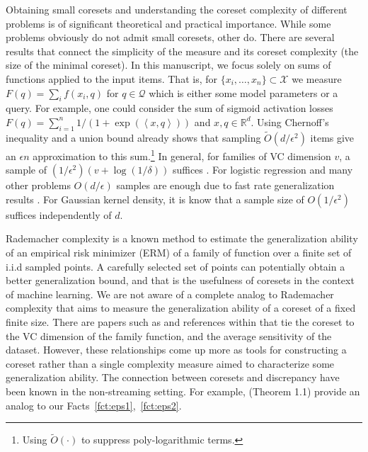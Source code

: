 \documentclass[anon,12pt]{colt2019} %
\newcommand{\ip}[1]{\left \langle #1 \right \rangle}
\newcommand{\R}{\mathbb{R}}
\newcommand{\eps}{\epsilon}
\newcommand{\X}{\mathcal{X}}
\newcommand{\Q}{\mathcal{Q}}
\begin{document}
Obtaining small coresets and understanding the coreset complexity of different problems is of significant theoretical and practical importance.
While some problems obviously do not admit small coresets, other do. 
There are several results that connect the simplicity of the measure and its coreset complexity (the size of the minimal coreset).
In this manuscript, we focus solely on sums of functions applied to the input items.
That is, for $\{x_i,\ldots,x_n\} \subset \X$ we measure $F(q) = \sum_i f(x_i,q)$ for $q \in \Q$ which is either some model parameters or a query.
For example, one could consider the sum of sigmoid activation losses $F(q) = \sum_{i=1}^{n} 1/(1+ \exp(\ip{x,q}))$ and $x,q\in \R^d$.
Using Chernoff's inequality and a union bound already shows that sampling $\tilde O(d/\eps^2)$ items give an $\eps n$ approximation to this sum.\footnote{Using $\tilde O(\cdot)$ to suppress poly-logarithmic terms.} 
In general, for families of VC dimension $v$, a sample of $(1/\eps^2)(v+\log(1/\delta))$ suffices \cite{talagrand1994sharper}.
For logistic regression and many other problems $O(d/\eps)$ samples are enough due to fast rate generalization results \cite{van2015fast}.
For Gaussian kernel density, it is know that a sample size of $O(1/\eps^2)$ suffices independently of $d$.

Rademacher complexity \cite{Bartlett:2003:RGC:944919.944944} is a known method to estimate the generalization ability of an empirical risk minimizer (ERM) of a family of function over a finite set of i.i.d sampled points. A carefully selected set of points can potentially obtain a better generalization bound, and that is the usefulness of coresets in the context of machine learning. We are not aware of a complete analog to Rademacher complexity that aims to measure the generalization ability of a coreset of a fixed finite size. There are papers such as \cite{langberg2010universal, tolochinsky2018coresets} and references within that tie the coreset to the VC dimension of the family function, and the average sensitivity of the dataset. However, these relationships come up more as tools for constructing a coreset rather than a single complexity measure aimed to characterize some generalization ability. The connection between coresets and discrepancy have been known in the non-streaming setting. For example, \cite{phillips2009small} (Theorem 1.1) provide an analog to our Facts~\ref{fct:eps1},~\ref{fct:eps2}.
\end{document}
